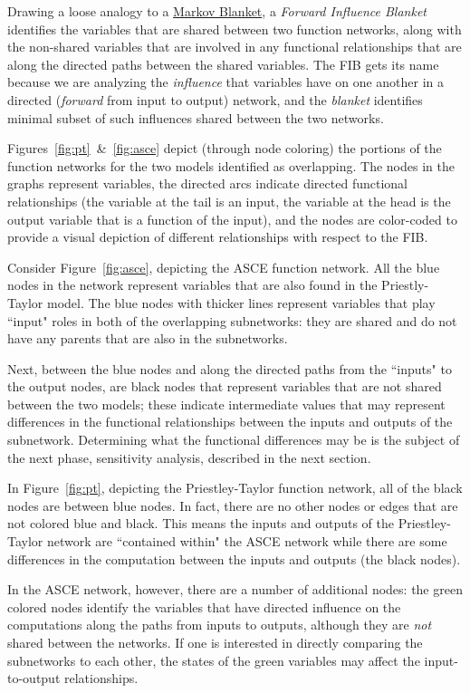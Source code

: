 \documentclass[article, 12pt, oneside]{memoir}
\begin{document}
Drawing a loose analogy to a
\href{https://en.wikipedia.org/wiki/Markov_blanket}{Markov Blanket}, a
\emph{Forward Influence Blanket} identifies the variables that are
shared between two function networks, along with the non-shared
variables that are involved in any functional relationships that are
along the directed paths between the shared variables. The FIB gets its
name because we are analyzing the \emph{influence} that variables have
on one another in a directed (\emph{forward} from input to output)
network, and the \emph{blanket} identifies minimal subset of such
influences shared between the two networks.

Figures~\ref{fig:pt}~\&~\ref{fig:asce} depict 
(through node coloring) the portions of the
function networks for the two models identified as overlapping. The
nodes in the graphs represent variables, the directed arcs indicate
directed functional relationships (the variable at the tail is an input,
the variable at the head is the output variable that is a function of
the input), and the nodes are color-coded to provide a visual depiction
of different relationships with respect to the FIB.

Consider Figure~\ref{fig:asce}, depicting the ASCE function network. All the
blue nodes in the network represent variables that are also found in the
Priestly-Taylor model. The blue nodes with thicker lines represent
variables that play ``input" roles in both of the overlapping
subnetworks: they are shared and do not have any parents that are also
in the subnetworks.

Next, between the blue nodes and along the directed paths from the
``inputs" to the output nodes, are black nodes that represent variables
that are not shared between the two models; these indicate intermediate
values that may represent differences in the functional relationships
between the inputs and outputs of the subnetwork. Determining what the
functional differences may be is the subject of the next phase,
sensitivity analysis, described in the next section.

In Figure~\ref{fig:pt}, depicting the Priestley-Taylor function network,
all of the black nodes are between blue nodes. In fact, there are no
other nodes or edges that are not colored blue and black. This means the
inputs and outputs of the Priestley-Taylor network are ``contained
within" the ASCE network while there are some differences in the
computation between the inputs and outputs (the black nodes).

In the ASCE network, however, there are a number of additional nodes:
the green colored nodes identify the variables that have directed
influence on the computations along the paths from inputs to outputs,
although they are \emph{not} shared between the networks. If one is
interested in directly comparing the subnetworks to each other, the
states of the green variables may affect the input-to-output
relationships.
\end{document}
